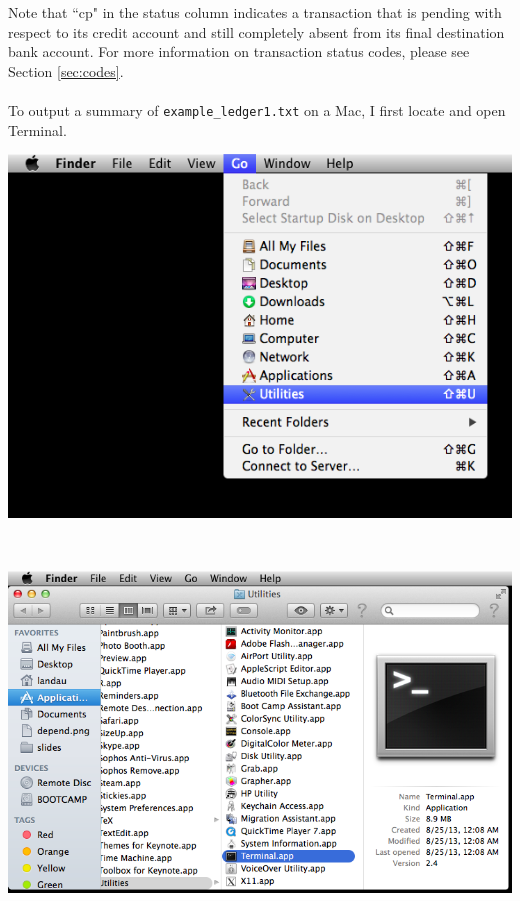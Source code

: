 \documentclass{article}
\providecommand{\q}{$\quad$ \newline}
\begin{document}
\begin{flushleft}
Note that ``cp" in the status column indicates a transaction that is pending with respect to its credit account and still completely absent from its final destination bank account. For more information on transaction status codes, please see Section \ref{sec:codes}. 

\paragraph{} To output a summary of {\tt example\_ledger1.txt} on a Mac, I first locate and open Terminal. \q

\begin{center}
\includegraphics[scale=.75]{fig/open2.png}
\end{center} \q

\begin{center}
\includegraphics[scale=.6]{fig/open1.png}
\end{center} \q


\end{flushleft}
\end{document}
